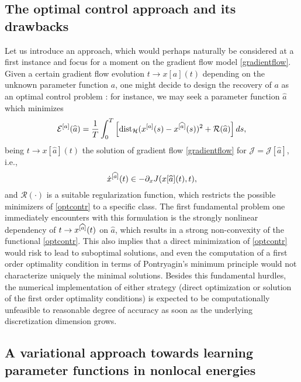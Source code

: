 \subsection{The optimal control approach and its drawbacks}
Let us introduce an approach, which would perhaps naturally be considered at a first instance and focus for a moment on the gradient flow model \eqref{gradientflow}. Given a certain gradient flow evolution $t \to x[a](t)$ depending on the unknown parameter function $a$, one might decide to design the recovery of $a$ as an optimal control problem \cite{brpi07}: for instance, we may seek a parameter function $\widehat a$ which minimizes
\begin{equation}\label{optcontr}
\mathcal E^{[a]}(\widehat a) = \frac{1}{T}\int_0^T \left [ \operatorname{dist}_{\mathcal H}(x^{[a]}(s) - x^{[\widehat a]}(s))^2 + \mathcal R(\widehat a) \right ] d s ,
\end{equation}
being $t \to x[\widehat a](t)$ the solution of gradient flow \eqref{gradientflow} for $\mathcal J = \mathcal J[\widehat a]$, i.e.,
\begin{equation}\label{gradientflow2}
\dot{x}^{[\widehat a]}(t) \in - \partial_x J(x[\widehat a](t),t),
\end{equation}
and $\mathcal R(\cdot)$ is a suitable regularization function, which restricts the possible minimizers of \eqref{optcontr} to a specific class. The first fundamental problem one immediately encounters with this formulation is the strongly nonlinear dependency of $t \to x^{[\widehat a]}(t)$ on $\widehat a$, which results in a strong non-convexity of the functional \eqref{optcontr}. This also implies that a direct minimization of \eqref{optcontr} would risk to lead to suboptimal solutions, and even the computation of a first order optimality condition in terms of Pontryagin's minimum principle would not characterize uniquely the minimal solutions. Besides this fundamental hurdles, the numerical implementation of either strategy (direct optimization or solution of the first order optimality conditions) is expected to be computationally unfeasible to reasonable degree of accuracy as soon as the underlying discretization dimension grows.

\subsection{A variational approach towards learning parameter functions in nonlocal energies}\label{sec:wp2}

